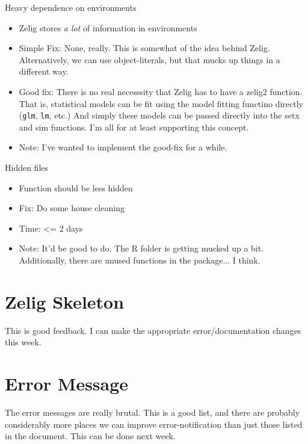 \documentclass{article}
\begin{document}
Heavy dependence on environments \begin{itemize}
  \item Zelig stores \emph{a lot} of information in environments
  \item Simple Fix: None, really. This is somewhat of the idea behind Zelig. Alternatively, we can use object-literals, but that mucks up things in a different way.
  \item Good fix: There is no real necesssity that Zelig has to have a zelig2 function. That is, statistical models can be fit using the model fitting functino directly ({\tt glm}, {\tt lm}, etc.)
    And simply these models can be passed directly into the setx and sim functions. I'm all for at least supporting this concept.
  \item Note: I've wanted to implement the good-fix for a while.
\end{itemize}

Hidden files \begin{itemize}
  \item Function should be less hidden
  \item Fix: Do some house cleaning
  \item Time: <= 2 days
  \item Note: It'd be good to do. The R folder is getting mucked up a bit. Additionally, there are unused functions in the package... I think.
\end{itemize}

\section{Zelig Skeleton}

This is good feedback. I can make the appropriate error/documentation changes this week.

\section{Error Message}

The error messages are really brutal. This is a good list, and there are probably considerably more places we can improve error-notification than just those listed in the document. This can be done next week.
\end{document}
